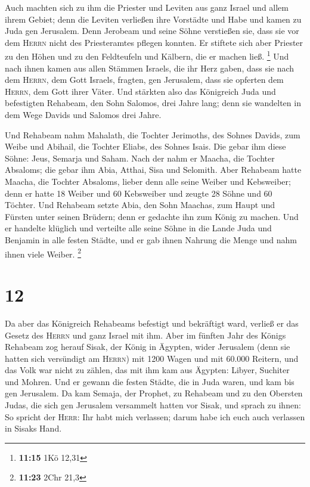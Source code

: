  Auch machten sich zu ihm die Priester und Leviten aus
ganz Israel und allem ihrem Gebiet;  denn die Leviten
verließen ihre Vorstädte und Habe und kamen zu Juda gen Jerusalem. Denn
Jerobeam und seine Söhne verstießen sie, dass sie vor dem \textsc{Herrn}
nicht des Priesteramtes pflegen konnten.  Er stiftete
sich aber Priester zu den Höhen und zu den Feldteufeln und Kälbern, die
er machen ließ. \footnote{\textbf{11:15} 1Kö 12,31}  Und
nach ihnen kamen aus allen Stämmen Israels, die ihr Herz gaben, dass sie
nach dem \textsc{Herrn}, dem Gott Israels, fragten, gen Jerusalem, dass
sie opferten dem \textsc{Herrn}, dem Gott ihrer Väter. 
Und stärkten also das Königreich Juda und befestigten Rehabeam, den Sohn
Salomos, drei Jahre lang; denn sie wandelten in dem Wege Davids und
Salomos drei Jahre.

 Und Rehabeam nahm Mahalath, die Tochter Jerimoths, des
Sohnes Davids, zum Weibe und Abihail, die Tochter Eliabs, des Sohnes
Isais.  Die gebar ihm diese Söhne: Jeus, Semarja und
Saham.  Nach der nahm er Maacha, die Tochter Absaloms;
die gebar ihm Abia, Atthai, Sisa und Selomith.  Aber
Rehabeam hatte Maacha, die Tochter Absaloms, lieber denn alle seine
Weiber und Kebsweiber; denn er hatte 18 Weiber und 60 Kebsweiber und
zeugte 28 Söhne und 60 Töchter.  Und Rehabeam setzte
Abia, den Sohn Maachas, zum Haupt und Fürsten unter seinen Brüdern; denn
er gedachte ihn zum König zu machen.  Und er handelte
klüglich und verteilte alle seine Söhne in die Lande Juda und Benjamin
in alle festen Städte, und er gab ihnen Nahrung die Menge und nahm ihnen
viele Weiber. \footnote{\textbf{11:23} 2Chr 21,3}

\hypertarget{section-3}{%
\section{12}\label{section-3}}

 Da aber das Königreich Rehabeams befestigt und bekräftigt
ward, verließ er das Gesetz des \textsc{Herrn} und ganz Israel mit ihm.
 Aber im fünften Jahr des Königs Rehabeam zog herauf
Sisak, der König in Ägypten, wider Jerusalem (denn sie hatten sich
versündigt am \textsc{Herrn})  mit 1200 Wagen und mit
60.000 Reitern, und das Volk war nicht zu zählen, das mit ihm kam aus
Ägypten: Libyer, Suchiter und Mohren.  Und er gewann die
festen Städte, die in Juda waren, und kam bis gen Jerusalem.
 Da kam Semaja, der Prophet, zu Rehabeam und zu den
Obersten Judas, die sich gen Jerusalem versammelt hatten vor Sisak, und
sprach zu ihnen: So spricht der \textsc{Herr}: Ihr habt mich verlassen;
darum habe ich euch auch verlassen in Sisaks Hand.

